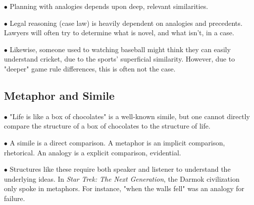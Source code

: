 \documentclass[english,openany]{book}
\begin{document}
$\bullet$ Planning with analogies depends upon deep, relevant similarities.

$\bullet$ Legal reasoning (case law) is heavily dependent on analogies and precedents. Lawyers will often try to determine what is novel, and what isn't, in a case.

$\bullet$ Likewise, someone used to watching baseball might think they can easily understand cricket, due to the sports' superficial similarity. However, due to "deeper" game rule differences, this is often not the case.

\subsection{Metaphor and Simile}

$\bullet$ "Life is like a box of chocolates" is a well-known simile, but one cannot directly compare the structure of a box of chocolates to the structure of life.

$\bullet$ A simile is a direct comparison. A metaphor is an implicit comparison, rhetorical. An analogy is a explicit comparison, evidential. 

$\bullet$ Structures like these require both speaker and listener to understand the underlying ideas. In \textit{Star Trek: The Next Generation}, the Darmok civilization only spoke in metaphors. For instance, "when the walls fell" was an analogy for failure.
\end{document}
